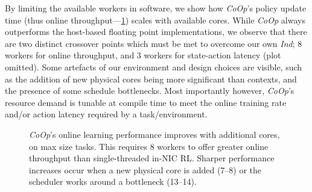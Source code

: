 \documentclass[
sigconf,natbib=false
,anonymous=true
,10pt
]{acmart}
\newcommand{\Coopfw}{\emph{CoOp}}
\newcommand{\Indfw}{\emph{Ind}}
\begin{document}
By limiting the available workers in software, we show how \Coopfw{}'s policy update time (thus  online throughput---\cref{fig:vary-core}) scales with available cores.
While \Coopfw{} always outperforms the host-based floating point implementations, we observe that there are two distinct crossover points which must be met to overcome our own \Indfw{}; \num{8} workers for online throughput, and \num{3} workers for state-action latency (plot omitted).
Some artefacts of our environment and design choices are visible, such as the addition of new physical cores being more significant than contexts, and the presence of some schedule bottlenecks.
Most importantly however, \Coopfw{}'s resource demand is tunable at compile time to meet the online training rate and/or action latency required by a task/environment.

\begin{figure}[t]
	\caption{
		\Coopfw{}'s online learning performance improves with additional cores, on max size tasks. This requires \num{8} workers to offer greater online throughput than single-threaded in-NIC RL. Sharper performance increases occur when a new physical core is added (\numrange{7}{8}) or the scheduler works around a bottleneck (\numrange{13}{14}).\label{fig:vary-core}}
\end{figure}

\end{document}
